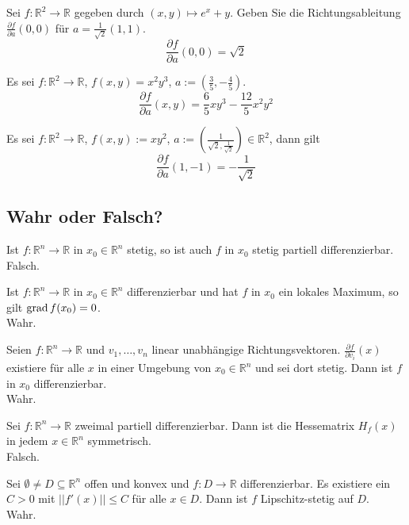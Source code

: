 \documentclass[parskip=full]{scrartcl}
\begin{document}
Sei $f : \mathbb{R}^2 \to \mathbb{R}$ gegeben durch $(x,y) \mapsto e^x + y$.
Geben Sie die Richtungsableitung $\frac{\partial f}{\partial a}(0,0)$ für $a = \frac{1}{\sqrt{2}} (1,1)$.
\begin{displaymath}
  \frac{\partial f}{\partial a} (0,0) = \sqrt{2}
\end{displaymath}

Es sei $f : \mathbb{R}^2 \to \mathbb{R}$, $f(x,y) = x^2y^3$, $a := \left(\frac{3}{5}, -\frac{4}{5}\right)$.
\begin{displaymath}
  \frac{\partial f}{\partial a}(x,y) = \frac{6}{5}xy^3 - \frac{12}{5}x^2y^2
\end{displaymath}

Es sei $f : \mathbb{R}^2 \to \mathbb{R}$, $f(x,y) := xy^2$, $a := \left(\frac{1}{\sqrt{2}, \frac{1}{\sqrt{2}}}\right) \in \mathbb{R}^2$, dann gilt
\begin{displaymath}
  \frac{\partial f}{\partial a}(1, -1) = -\frac{1}{\sqrt{2}}
\end{displaymath}

\subsection{Wahr oder Falsch?}
Ist $f : \mathbb{R}^n \to \mathbb{R}$ in $x_0 \in \mathbb{R}^n$ stetig, so ist auch $f$ in $x_0$ stetig partiell differenzierbar.\\
Falsch.

Ist $f : \mathbb{R}^n \to \mathbb{R}$ in $x_0 \in \mathbb{R}^n$ differenzierbar und hat $f$ in $x_0$ ein lokales Maximum, so gilt $\operatorname{grad} f(x_0) = 0$.\\
Wahr.

Seien $f : \mathbb{R}^n \to \mathbb{R}$ und $v_1, \dots, v_n$ linear unabhängige Richtungsvektoren.
$\frac{\partial f}{\partial v_i}(x)$ existiere für  alle $x$ in einer Umgebung von $x_0 \in \mathbb{R}^n$ und sei dort stetig.
Dann ist $f$ in $x_0$ differenzierbar.\\
Wahr.

Sei $f : \mathbb{R}^n \to \mathbb{R}$ zweimal partiell differenzierbar.
Dann ist die Hessematrix $H_f(x)$ in jedem $x \in \mathbb{R}^n$ symmetrisch.\\
Falsch.

Sei $\emptyset \neq D \subseteq \mathbb{R}^n$ offen und konvex und $f : D \to \mathbb{R}$ differenzierbar.
Es existiere ein $C > 0$ mit $|| f'(x) || \leq C$ für alle $x \in D$.
Dann ist $f$ Lipschitz-stetig auf $D$.\\
Wahr.
\end{document}
